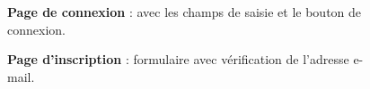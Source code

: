 \documentclass[12pt]{report}
\begin{document}
\begin{figure}[H]
\begin{minipage}[t]{0.45\textwidth}
			\caption*{\textbf{Page de connexion} : avec les champs de saisie et le bouton de connexion.}
		\end{minipage}
		\hfill
		\begin{minipage}[t]{0.45\textwidth}
			\centering
			\caption*{\textbf{Page d'inscription} : formulaire avec vérification de l’adresse e-mail.}
		\end{minipage}
	\end{figure}
	
\end{document}
